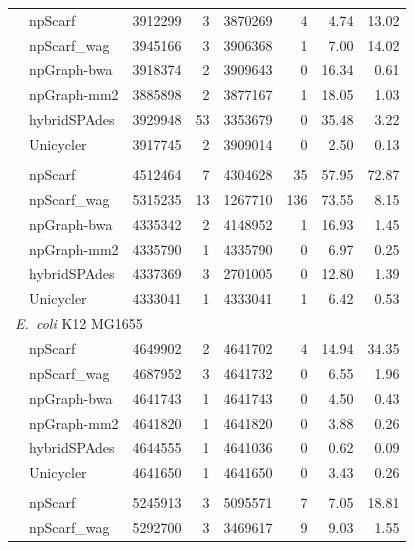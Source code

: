 \documentclass[10pt,letterpaper]{article}
\newcommand{\ec}{\emph{E.~coli}}
\begin{document}
\begin{longtable}[!hpt]{llcrrrrr}
\nobreakmidrule
& npScarf & 3912299  &  3  &  3870269  &  4  & 4.74  & 13.02 \\*
& npScarf\_wag & 3945166  &  3  &  3906368  &  1  & 7.00  & 14.02 \\*
& npGraph-bwa & 3918374  &  2  &  3909643  &  0 & 16.34  & 0.61 \\*
& npGraph-mm2 & 3885898  &  2  &  3877167  & 1 & 18.05  & 1.03 \\*
& hybridSPAdes &  3929948 &  53  &  3353679  &  0  & 35.48  & 3.22\\*
& Unicycler & 3917745  &  2 & 3909014  & 0  & 2.50  &  0.13\\
\hline
\rowcolor{Gray}
\multicolumn{8}{l}{\emph{Acinetobacter} AB30} \\* %
\nobreakmidrule
\rowcolor{Gray}
& npScarf & 4512464  &  7  &  4304628  &  35  & 57.95  & 72.87\\*
\rowcolor{Gray}
& npScarf\_wag & 5315235  &  13  &  1267710  &  136  &  73.55 & 8.15\\*
\rowcolor{Gray}
& npGraph-bwa & 4335342  &  2  &  4148952  &  1  & 16.93  & 1.45\\*
\rowcolor{Gray}
& npGraph-mm2 & 4335790  &  1  &  4335790  & 0   &  6.97 & 0.25\\*
\rowcolor{Gray}
& hybridSPAdes & 4337369  &  3  &  2701005  &  0  &  12.80 &  1.39\\*
\rowcolor{Gray}
& Unicycler &  4333041 &  1  &  4333041  &  1  &  6.42 &  0.53\\
\hline
\multicolumn{8}{l}{\ec{} K12 MG1655} \\* %
\nobreakmidrule
& npScarf & 4649902  &  2  &  4641702  &  4  & 14.94  & 34.35 \\*
& npScarf\_wag &  4687952 &  3  &  4641732  &  0  & 6.55  &  1.96\\*
& npGraph-bwa & 4641743  &  1  &  4641743  & 0  &  4.50 & 0.43 \\*
& npGraph-mm2 & 4641820  &  1  &  4641820  &  0 &  3.88 & 0.26 \\*
& hybridSPAdes &  4644555 &  1  &  4641036  &  0  & 0.62  & 0.09\\*
& Unicycler & 4641650  &  1 &  4641650 &  0 & 3.43  & 0.26 \\
\hline
\rowcolor{Gray}
\multicolumn{8}{l}{\ec{} O25b H4-ST131} \\* %
\nobreakmidrule
\rowcolor{Gray}
& npScarf &  5245913 &  3  &  5095571  &  7  &  7.05 & 18.81\\*
\rowcolor{Gray}
& npScarf\_wag & 5292700  &  3  &  3469617  &  9  &  9.03 & 1.55\\*

\end{longtable}
\end{document}
